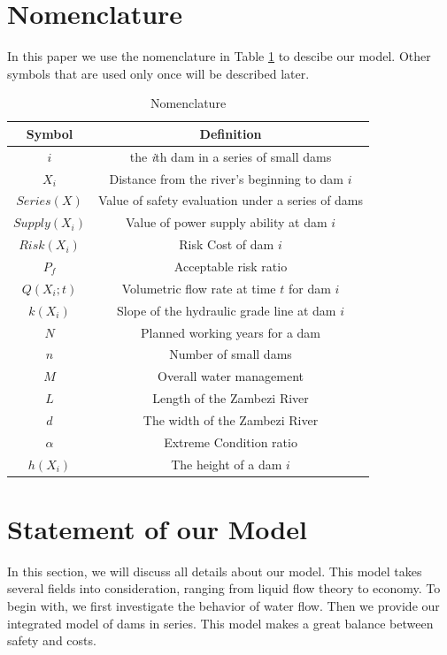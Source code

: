 \documentclass{mcmthesis}
\begin{document}
\section{Nomenclature}\label{Sec-Nomen}
In this paper we use the nomenclature in Table \ref{tab:Nomen} to descibe our model. Other symbols that are used only once will be described later.
\begin{table}
    \centering
    \caption{Nomenclature}
    \label{tab:Nomen}
    \begin{tabular}{c c}
\hline
    	Symbol & Definition\\
\hline
	$i$ & the \emph{i}th dam in a series of small dams\\
	$X_i$ & Distance from the river's beginning to dam $i$\\
	$Series(X)$ & Value of safety evaluation under a series of dams\\
	$Supply(X_i)$ & Value of power supply ability at dam $i$\\
	$Risk(X_i)$ & Risk Cost of dam $i$\\
	$P_f$ & Acceptable risk ratio\\
	$Q(X_i;t)$ & Volumetric flow rate at time $t$ for dam $i$\\
	$k(X_i)$ & Slope of the hydraulic grade line at dam $i$\\
	$N$ & Planned working years for a dam\\
	$n$ & Number of small dams\\
	$M$ & Overall water management\\
	$L$ & Length of the Zambezi River\\
	$d$ & The width of the Zambezi River\\
	$\alpha$& Extreme Condition ratio\\
	$h(X_i)$ & The height of a dam $i$\\
\hline
    \end{tabular}
\end{table}
\section{Statement of our Model} \label{Sec-Model}
In this section, we will discuss all details about our model. This model takes several fields into consideration, ranging from liquid flow theory to economy. To begin with, we first investigate the behavior of water flow. Then we provide our integrated model of dams in series. This model makes a great balance between safety and costs.
\end{document}
